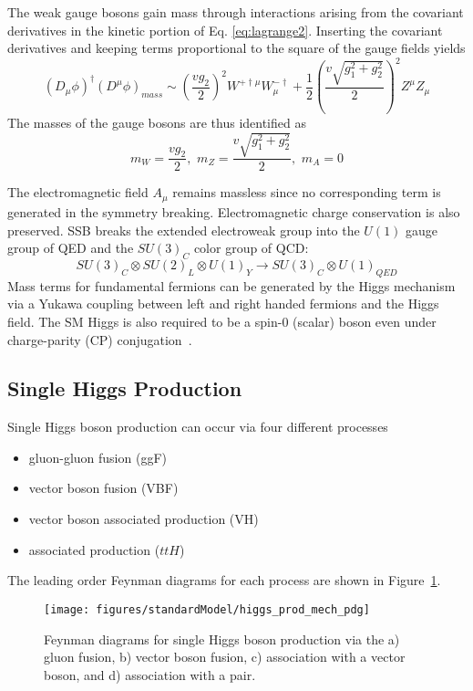 The weak gauge bosons gain mass through interactions arising from the covariant derivatives in the kinetic portion of Eq. \ref{eq:lagrange2}. Inserting the covariant derivatives and keeping terms proportional to the square of the gauge fields yields
\begin{equation}
(D_{\mu}\phi)^{\dagger}(D^{\mu}\phi)_{mass}\sim(\frac{vg_2}{2})^2W^{+\dagger\mu}W^{-\dagger}_{\mu}+\frac{1}{2}(\frac{v\sqrt{g_1^2+g_2^2}}{2})^2Z^{\mu}Z_{\mu}
\end{equation}
The masses of the gauge bosons are thus identified as
\begin{equation}
m_W=\frac{vg_2}{2},\,\,m_Z=\frac{v\sqrt{g_1^2+g_2^2}}{2},\,\,m_A=0
\end{equation}

The electromagnetic field $A_\mu$ remains massless since no corresponding term is generated in the symmetry breaking. Electromagnetic charge conservation is also preserved. SSB breaks the extended electroweak group into the $U(1)$ gauge group of QED and the $SU(3)_C$ color group of QCD:  
\begin{equation}
SU(3)_C\otimes SU(2)_L\otimes U(1)_Y \rightarrow SU(3)_C\otimes U(1)_{QED}
\end{equation}
Mass terms for fundamental fermions can be generated by the Higgs mechanism via a Yukawa coupling between left and right handed fermions and the Higgs field. The SM Higgs is also required to be a spin-0 (scalar) boson even under charge-parity (CP) conjugation~\cite{Carena:577783}. 

\subsection{Single Higgs Production}
Single Higgs boson production can occur via four different processes
\begin{itemize}
\item gluon-gluon fusion (ggF)
\item vector boson fusion (VBF)
\item vector boson associated production (VH)
\item \ttbar associated production ($ttH$)
\end{itemize}
The leading order Feynman diagrams for each process are shown in Figure~\ref{fig:higgsProductionFeynman}.
\begin{figure}[h!]
\centering
\texttt{[image: figures/standardModel/higgs\_prod\_mech\_pdg]}
\caption{Feynman diagrams for single Higgs boson production via the a) gluon fusion, b) vector boson fusion, c) association with a vector boson, and d) association with a \ttbar pair.}
\label{fig:higgsProductionFeynman}
\end{figure}

